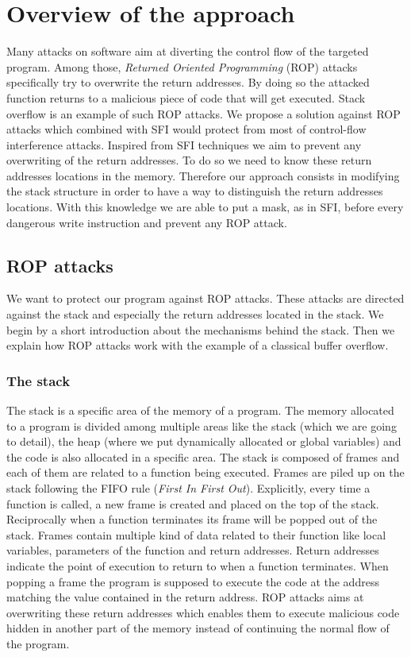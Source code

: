 \documentclass[11pt]{sdm}
\begin{document}
\newpage
\section{Overview of the approach}
\label{sec:Overview of the approach}
	Many attacks on software aim at diverting the control flow of the targeted program. Among those, \textit{Returned Oriented Programming} (ROP) attacks specifically try to overwrite the return addresses.
By doing so the attacked function returns to a malicious piece of code that will get executed.
Stack overflow is an example of such ROP attacks.
We propose a solution against ROP attacks which combined with SFI would protect from most of control-flow interference attacks.
Inspired from SFI techniques we aim to prevent any overwriting of the return addresses. To do so we need to know these return addresses locations in the memory. Therefore our approach consists in modifying the stack structure in order to have a way to distinguish the return addresses locations. With this knowledge we are able to put a mask, as in SFI, before every dangerous write instruction and prevent any ROP attack.


\subsection{ROP attacks}
\label{sub:rop_attack}

	We want to protect our program against ROP attacks. These attacks are directed against the stack and especially the return addresses located in the stack.
We begin by a short introduction about the mechanisms behind the stack. Then we explain how ROP attacks work with the example of a classical buffer overflow.

\subsubsection{The stack}
\label{ssub:The stack}
	The stack is a specific area of the memory of a program. The memory allocated to a program is divided among multiple areas like the stack (which we are going to detail), the heap (where we put dynamically allocated or global variables) and the code is also allocated in a specific area.
The stack is composed of frames and each of them are related to a function being executed. Frames are piled up on the stack following the FIFO rule (\textit{First In First Out}). Explicitly, every time a function is called, a new frame is created and placed on the top of the stack. Reciprocally when a function terminates its frame will be popped out of the stack.
Frames contain multiple kind of data related to their function like local variables, parameters of the function and return addresses. Return addresses indicate the point of execution to return to when a function terminates. When popping a frame the program is supposed to execute the code at the address matching the value contained in the return address.
ROP attacks aims at overwriting these return addresses which enables them to execute malicious code hidden in another part of the memory instead of continuing the normal flow of the program.
\end{document}
